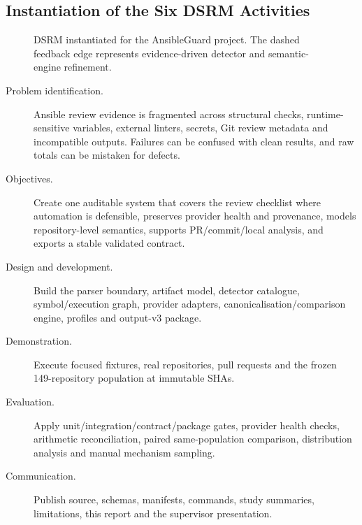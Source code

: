 \subsection{Instantiation of the Six DSRM Activities}
\begin{figure}[H]
\centering
{}
\caption{DSRM instantiated for the AnsibleGuard project. The dashed feedback
edge represents evidence-driven detector and semantic-engine refinement.}
\label{fig:dsrm_instantiation}
\end{figure}

\begin{description}
  \item[Problem identification.] Ansible review evidence is fragmented across
  structural checks, runtime-sensitive variables, external linters, secrets,
  Git review metadata and incompatible outputs. Failures can be confused with
  clean results, and raw totals can be mistaken for defects.
  \item[Objectives.] Create one auditable system that covers the review
  checklist where automation is defensible, preserves provider health and
  provenance, models repository-level semantics, supports PR/commit/local
  analysis, and exports a stable validated contract.
  \item[Design and development.] Build the parser boundary, artifact model,
  detector catalogue, symbol/execution graph, provider adapters,
  canonicalisation/comparison engine, profiles and output-v3 package.
  \item[Demonstration.] Execute focused fixtures, real repositories, pull
  requests and the frozen 149-repository population at immutable SHAs.
  \item[Evaluation.] Apply unit/integration/contract/package gates, provider
  health checks, arithmetic reconciliation, paired same-population comparison,
  distribution analysis and manual mechanism sampling.
  \item[Communication.] Publish source, schemas, manifests, commands, study
  summaries, limitations, this report and the supervisor presentation.
\end{description}

